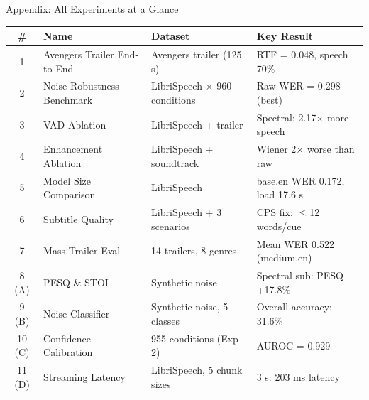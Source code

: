 \documentclass[aspectratio=169]{beamer}
\begin{document}
\appendix
\begin{frame}{Appendix: All Experiments at a Glance}
  \begin{center}
    \small
    \begin{tabular}{@{}clll@{}}
      \toprule
      \textbf{\#} & \textbf{Name} & \textbf{Dataset} & \textbf{Key Result} \\
      \midrule
      1 & Avengers Trailer End-to-End & Avengers trailer (125 s) & RTF = 0.048, speech 70\% \\
      2 & Noise Robustness Benchmark & LibriSpeech × 960 conditions & Raw WER = 0.298 (best) \\
      3 & VAD Ablation & LibriSpeech + trailer & Spectral: 2.17× more speech \\
      4 & Enhancement Ablation & LibriSpeech + soundtrack & Wiener 2× worse than raw \\
      5 & Model Size Comparison & LibriSpeech & base.en WER 0.172, load 17.6 s \\
      6 & Subtitle Quality & LibriSpeech + 3 scenarios & CPS fix: $\leq$12 words/cue \\
      7 & Mass Trailer Eval & 14 trailers, 8 genres & Mean WER 0.522 (medium.en) \\
      8 (A) & PESQ \& STOI & Synthetic noise & Spectral sub: PESQ +17.8\% \\
      9 (B) & Noise Classifier & Synthetic noise, 5 classes & Overall accuracy: 31.6\% \\
      10 (C) & Confidence Calibration & 955 conditions (Exp 2) & AUROC = 0.929 \\
      11 (D) & Streaming Latency & LibriSpeech, 5 chunk sizes & 3 s: 203 ms latency \\
      \bottomrule
    \end{tabular}
  \end{center}
\end{frame}
\end{document}
